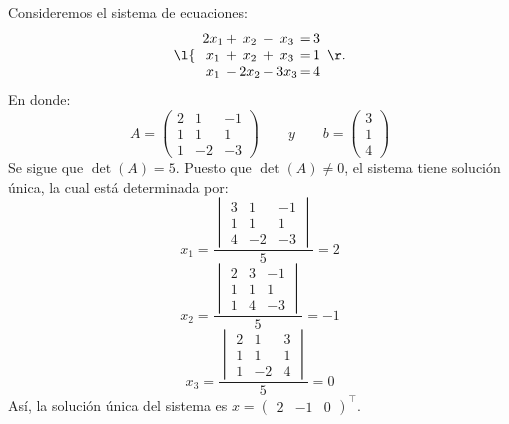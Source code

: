 \documentclass[compacto,10pt]{pubciencias-notas}
\begin{document}
\begin{ejem}
    Consideremos el sistema de ecuaciones:
    \[
        \l\{
        \begin{array}{c@{\,}c@{\,}c@{\,}c@{\,}c@{\,}c@{\,}c}
        2x_1 & + & x_2  & - & x_3  & = & 3 \\
        x_1  & + & x_2  & + & x_3  & = & 1 \\
        x_1  & - & 2x_2 & - & 3x_3 & = & 4 \\
        \end{array}
        \r.
    \]
    En donde:
    \[
        A = 
        \begin{pmatrix}
            2 & 1 & -1 \\
            1 & 1 & 1 \\
            1 & -2 & -3
        \end{pmatrix} \qquad y \qquad b =
        \begin{pmatrix}
            3 \\
            1 \\
            4
        \end{pmatrix}
    \]
    Se sigue que $\det(A) = 5$. Puesto que $\det(A) \not = 0$, el sistema tiene solución única, la cual está determinada por:
    \[
        x_1 = \dfrac{
        \begin{vmatrix}
            3 & 1 & -1 \\
            1 & 1 & 1 \\
            4 & -2 & -3
        \end{vmatrix}}{5} = 2
    \]
    \[
        x_2 = \dfrac{
        \begin{vmatrix}
            2 & 3 & -1 \\
            1 & 1 & 1 \\
            1 & 4 & -3
        \end{vmatrix}}{5} = -1
    \]
    \[
        x_3 = \dfrac{
        \begin{vmatrix}
            2 & 1 & 3 \\
            1 & 1 & 1 \\
            1 & -2 & 4
        \end{vmatrix}}{5} = 0
    \]
    Así, la solución única del sistema es $x = \begin{pmatrix}2&-1&0\end{pmatrix}^{\intercal}$.
\end{ejem}
\end{document}
